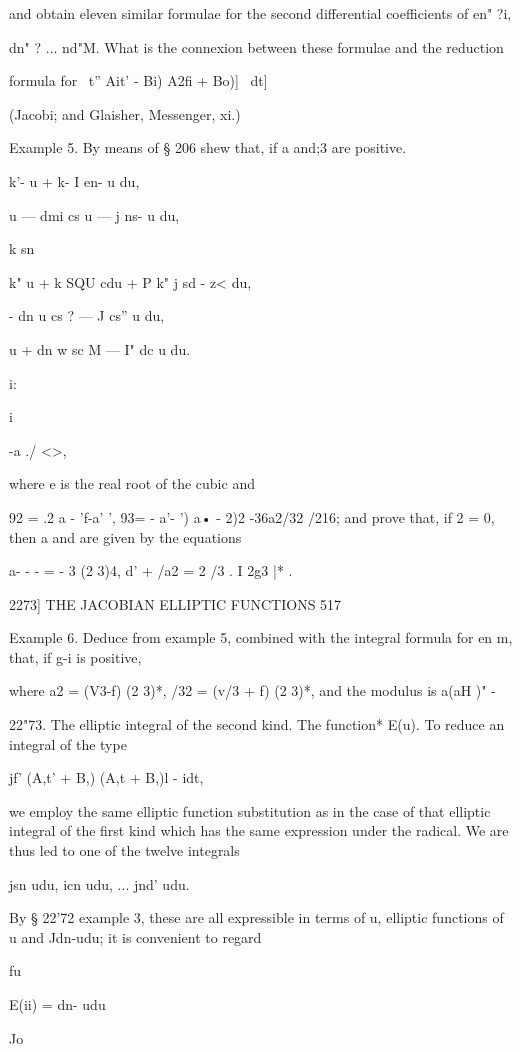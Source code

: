 and obtain eleven similar formulae for the second differential
coefficients of en" ?i,

dn" ? ... nd"M. What is the connexion between these formulae and the
reduction

formula for \ t'' Ait' - Bi) A2fi + Bo)]~ dt]

(Jacobi; and Glaisher, Messenger, xi.)

Example 5. By means of § 206 shew that, if a and;3 are positive.

k'- u + k- I en- u du,

u — dmi cs u — j ns- u du,

k sn %

k" u + k SQU cdu + P k" j sd - z< du,

- dn u cs ? — J cs'' u du,

u + dn w sc M — I" dc u du.

i:

 i

-a ./ <>,

where e is the real root of the cubic and

92 = .2 a - 'f-a' ', 93= - a'- ') a• - 2)2 -36a2/32 /216; and prove
that, if 2 = 0, then a and are given by the equations

a- - - = - 3 (2 3)4, d' + /a2 = 2 /3 . I 2g3 |* .

2273] THE JACOBIAN ELLIPTIC FUNCTIONS 517

Example 6. Deduce from example 5, combined with the integral formula
for en m, that, if g-i is positive,

where a2 = (V3-f) (2 3)*, /32 = (v/3 + f) (2 3)*, and the modulus is
a(aH )" -

22"73. The elliptic integral of the second kind. The function* E(u).
To reduce an integral of the type

jf' (A,t' + B,) (A,t + B,)l - idt,

we employ the same elliptic function substitution as in the case of
that elliptic integral of the first kind which has the same expression
under the radical. We are thus led to one of the twelve integrals

jsn udu, icn udu, ... jnd' udu.

By § 22'72 example 3, these are all expressible in terms of u,
elliptic functions of u and Jdn-udu; it is convenient to regard

fu

E(ii) = dn- udu

Jo

